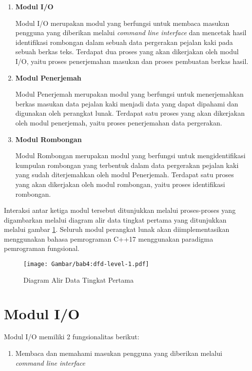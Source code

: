 \begin{enumerate}
    \item \textbf{Modul I/O}
    
    Modul I/O merupakan modul yang berfungsi untuk membaca masukan pengguna yang diberikan melalui \textit{command line interface} dan mencetak hasil identifikasi rombongan dalam sebuah data pergerakan pejalan kaki pada sebuah berkas teks. Terdapat dua proses yang akan dikerjakan oleh modul I/O, yaitu proses penerjemahan masukan dan proses pembuatan berkas hasil.
    
    \item \textbf{Modul Penerjemah}
    
    Modul Penerjemah merupakan modul yang berfungsi untuk menerjemahkan berkas masukan data pejalan kaki menjadi data yang dapat dipahami dan digunakan oleh perangkat lunak. Terdapat satu proses yang akan dikerjakan oleh modul penerjemah, yaitu proses penerjemahan data pergerakan.
    
    \item \textbf{Modul Rombongan}
    
    Modul Rombongan merupakan modul yang berfungsi untuk mengidentifikasi kumpulan rombongan yang terbentuk dalam data pergerakan pejalan kaki yang sudah diterjemahkan oleh modul Penerjemah. Terdapat satu proses yang akan dikerjakan oleh modul rombongan, yaitu proses identifikasi rombongan.
\end{enumerate}

Interaksi antar ketiga modul tersebut ditunjukkan melalui proses-proses yang digambarkan melalui diagram alir data tingkat pertama yang ditunjukkan melalui gambar \ref{bab4:dfd-level-1}. Seluruh modul perangkat lunak akan diimplementasikan menggunakan bahasa pemrograman C++17 menggunakan paradigma pemrograman fungsional.

\begin{figure}[t!]
    \centering
    \texttt{[image: Gambar/bab4:dfd-level-1.pdf]}
    \caption{Diagram Alir Data Tingkat Pertama}
    \label{bab4:dfd-level-1}
\end{figure}

\section{Modul I/O}
\label{io}

Modul I/O memiliki 2 fungsionalitas berikut:

\begin{enumerate}
    \item Membaca dan memahami masukan pengguna yang diberikan melalui \textit{command line interface}
\end{enumerate}